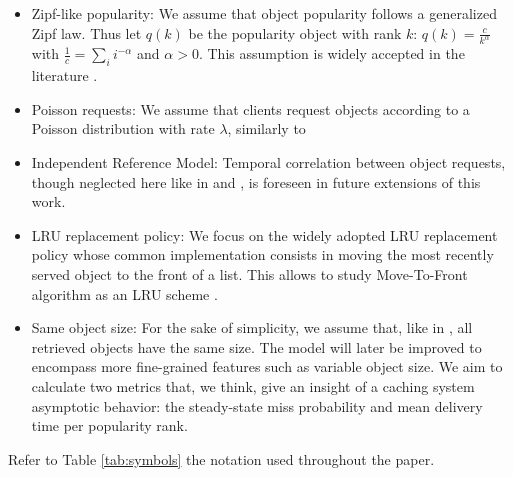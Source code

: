\documentclass[conference]{IEEEtran}
\begin{document}
\begin{itemize}
\item{Zipf-like popularity:}
We assume that object popularity follows a generalized Zipf 
law. Thus let $q(k)$ be the popularity object with rank $k$:
$ q(k) = \frac{c}{k^\alpha}$
with  $\frac{1}{c} = \sum \limits_i i^{-\alpha}$ and 
$\alpha > 0$. This assumption is widely accepted in the 
literature \cite{breslau:web} 
\cite{Mitra:2011:CWV:1961659.1961662}.

\item{Poisson requests:}
We assume that clients request objects according to a Poisson 
distribution with rate $\lambda$, similarly to 
\cite{Carofiglio:2013:PBS:2542828.2542992}

\item{Independent Reference Model:}
Temporal correlation between object requests, though 
neglected here like in 
\cite{Starobinski:2001:PMW:570289.570293} and 
\cite{Fricker:2012:VAA:2414276.2414286}, is foreseen in 
future extensions of this work.

\item{LRU replacement policy:} We focus on the widely adopted 
LRU replacement policy whose common implementation consists 
in moving the most recently served object to 
the front of a list. This allows to study Move-To-Front 
algorithm as an LRU scheme 
\cite{Jelenkovic:2004:OLC:1024662.1024670}.

\item{Same object size:} For the sake of simplicity, we 
assume that, like in \cite{Che:2006:HWC:2312147.2313846}, all 
retrieved objects have the same size. The model will later be 
improved to encompass more fine-grained features such as 
variable object size. We aim to calculate two metrics that, 
we think, give an insight  of a caching system asymptotic 
behavior: the steady-state miss probability  and mean 
delivery time per popularity rank.
\end{itemize}

Refer to Table \ref{tab:symbols} the notation used throughout 
the paper.
\end{document}
